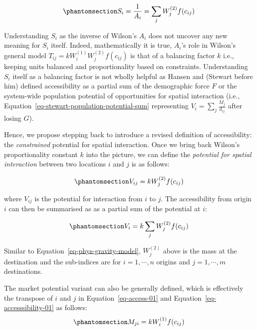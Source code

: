 \documentclass[
]{article}
\begin{document}
\begin{equation}\phantomsection\label{eq-Ai-as-accessibility}{
S_i = \frac{1}{A_i} = \sum_j W_j^{(2)} f(c_{ij})
}\end{equation}

Understanding \(S_i\) as the inverse of Wilson's \(A_i\) does not
uncover any new meaning for \(S_i\) itself. Indeed, mathematically it is
true, \(A_i\)'s role in Wilson's general model
\(T_{ij} = k W_i^{(1)} W_j^{(2)} f(c_{ij})\) is that of a balancing
factor \(k\) i.e., keeping units balanced and proportionality based on
constraints. Understanding \(S_i\) itself as a balancing factor is not
wholly helpful as Hansen and (Stewart before him) defined accessibility
as a partial sum of the demographic force \(F\) or the system-wide
population potential of opportunities for spatial interaction (i.e.,
Equation~\ref{eq-stewart-population-potential-sum} representing
\(V_i = \sum_j \frac{M_j}{d_{ij}}\) after losing \(G\)).

Hence, we propose stepping back to introduce a revised definition of
accessibility: the \emph{constrained} potential for spatial interaction.
Once we bring back Wilson's proportionality constant \(k\) into the
picture, we can define the \emph{potential for spatial interaction}
between two locations \(i\) and \(j\) is as follows:

\begin{equation}\phantomsection\label{eq-access-01}{
V_{ij} = k W_j^{(2)} f(c_{ij})
}\end{equation}

\noindent where \(V_{ij}\) is the potential for interaction from \(i\)
to \(j\). The accessibility from origin \(i\) can then be summarised as
as a partial sum of the potential at \(i\):

\begin{equation}\phantomsection\label{eq-accesssibility-01}{
V_{i} = k \sum_j W_j^{(2)} f(c_{ij})
}\end{equation}

Similar to Equation~\ref{eq-phys-gravity-model}, \(W_j^{(2)}\) above is
the mass at the destination and the sub-indices are for
\(i = 1,\cdots, n\) origins and \(j = 1,\cdots, m\) destinations.

The market potential variant can also be generally defined, which is
effectively the transpose of \(i\) and \(j\) in
Equation~\ref{eq-access-01} and Equation~\ref{eq-accesssibility-01} as
follows: \begin{equation}\phantomsection\label{eq-market-01}{
M_{ji} = k W_i^{(1)} f(c_{ij})
}\end{equation}
\end{document}
